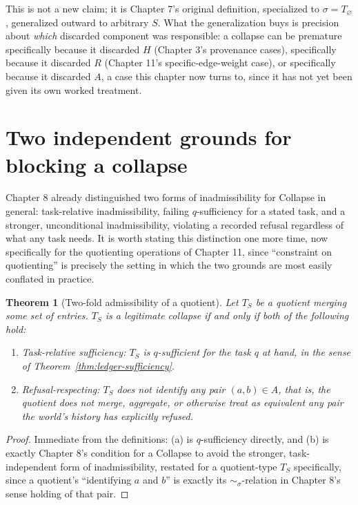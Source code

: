 \documentclass[11pt]{book}
\newtheorem{theorem}{Theorem}[chapter]
\begin{document}
This is not a new claim; it is Chapter 7's original definition, specialized to $\sigma=T_{\varnothing}$, generalized outward to arbitrary $S$. What the generalization buys is precision about \emph{which} discarded component was responsible: a collapse can be premature specifically because it discarded $H$ (Chapter 3's provenance cases), specifically because it discarded $R$ (Chapter 11's specific-edge-weight case), or specifically because it discarded $A$, a case this chapter now turns to, since it has not yet been given its own worked treatment.

\section{Two independent grounds for blocking a collapse}

Chapter 8 already distinguished two forms of inadmissibility for Collapse in general: task-relative inadmissibility, failing $q$-sufficiency for a stated task, and a stronger, unconditional inadmissibility, violating a recorded refusal regardless of what any task needs. It is worth stating this distinction one more time, now specifically for the quotienting operations of Chapter 11, since ``constraint on quotienting'' is precisely the setting in which the two grounds are most easily conflated in practice.

\begin{theorem}[Two-fold admissibility of a quotient]
\label{thm:two-fold-admissibility}
Let $T_S$ be a quotient merging some set of entries. $T_S$ is a legitimate collapse if and only if both of the following hold:
\begin{enumerate}
\item[(a)] \emph{Task-relative sufficiency}: $T_S$ is $q$-sufficient for the task $q$ at hand, in the sense of Theorem~\ref{thm:ledger-sufficiency}.
\item[(b)] \emph{Refusal-respecting}: $T_S$ does not identify any pair $(a,b)\in A$, that is, the quotient does not merge, aggregate, or otherwise treat as equivalent any pair the world's history has explicitly refused.
\end{enumerate}
\end{theorem}
\begin{proof}
Immediate from the definitions: (a) is $q$-sufficiency directly, and (b) is exactly Chapter 8's condition for a Collapse to avoid the stronger, task-independent form of inadmissibility, restated for a quotient-type $T_S$ specifically, since a quotient's ``identifying $a$ and $b$'' is exactly its $\sim_\sigma$-relation in Chapter 8's sense holding of that pair.
\end{proof}
\end{document}
